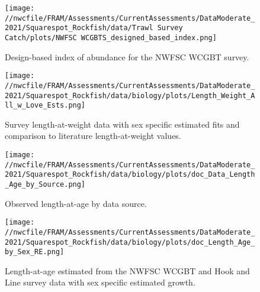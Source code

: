 \documentclass[11pt,
  english,
  a4paper,
]{article}
\begin{document}
\tagmcend\tagstructend


\begin{figure}
\centering
\texttt{[image: //nwcfile/FRAM/Assessments/CurrentAssessments/DataModerate\_2021/Squarespot\_Rockfish/data/Trawl Survey Catch/plots/NWFSC WCGBTS\_designed\_based\_index.png]}
\caption{Design-based index of abundance for the NWFSC WCGBT survey.\label{fig:wcgbts-dbindex}}
\end{figure}

\tagmcend\tagstructend


\begin{figure}
\centering
\texttt{[image: //nwcfile/FRAM/Assessments/CurrentAssessments/DataModerate\_2021/Squarespot\_Rockfish/data/biology/plots/Length\_Weight\_All\_w\_Love\_Ests.png]}
\caption{Survey length-at-weight data with sex specific estimated fits and comparison to literature length-at-weight values.\label{fig:len-weight}}
\end{figure}

\tagmcend\tagstructend


\begin{figure}
\centering
\texttt{[image: //nwcfile/FRAM/Assessments/CurrentAssessments/DataModerate\_2021/Squarespot\_Rockfish/data/biology/plots/doc\_Data\_Length\_Age\_by\_Source.png]}
\caption{Observed length-at-age by data source.\label{fig:len-age-data}}
\end{figure}

\tagmcend\tagstructend


\begin{figure}
\centering
\texttt{[image: //nwcfile/FRAM/Assessments/CurrentAssessments/DataModerate\_2021/Squarespot\_Rockfish/data/biology/plots/doc\_Length\_Age\_by\_Sex\_RE.png]}
\caption{Length-at-age estimated from the NWFSC WCGBT and Hook and Line survey data with sex specific estimated growth.\label{fig:len-age}}
\end{figure}
\end{document}
